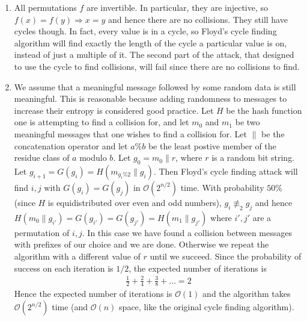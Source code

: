 \begin{enumerate}
\item All permutations $f$ are invertible. In particular,  they are injective, so
$f(x)=f(y) \Rightarrow x=y$ and hence there are no collisions. They still have
cycles though. In fact, every value is in a cycle, so Floyd's cycle finding algorithm
will find exactly the length of the cycle a particular value is on, instead of
just a multiple of it. The second part of the attack, that designed to use the
cycle to find collisions, will fail since there are no collisions to find.

\item We assume that a meaningful message followed by some random data is
still meaningful. This is reasonable because adding randomness to messages to
increase their entropy is considered good practice. Let $H$ be the hash function
one is attempting to find a collision for, and let $m_0$ and $m_1$ be two
meaningful messages that one wishes to find a collision for. Let $\|$ be the
concatenation operator and let $a\%b$ be the least postive member of the residue
class of $a$ modulo $b$. Let $g_0=m_0\|r$, where $r$ is a random bit string.
Let $g_{i+1}=G(g_i)=H(m_{g_i\%2}\|g_i)$. Then Floyd's cycle finding attack will
find $i,j$ with $G(g_i)=G(g_j)$ in $\mathcal{O}(2^{n/2})$ time. With probability
$50\%$ (since $H$ is equidistributed over even and odd numbers), $g_i\not\equiv_2 g_j$
and hence $H(m_0\|g_{i'})=G(g_{i'})=G(g_{j'})=H(m_1\|g_{j'})$ where $i',j'$ are
a permutation of $i,j$. In this case we have found a collision between messages
with prefixes of our choice and we are done. Otherwise we repeat the algorithm
with a different value of $r$ until we succeed. Since the probability of success
on each iteration is $1/2$, the expected number of iterations is
\begin{eqnarray*}
	\frac{1}{2}+\frac{2}{4}+\frac{3}{8}+\dots = 2
\end{eqnarray*}
Hence the expected number of iterations is $\mathcal{O}(1)$ and the algorithm
takes $\mathcal{O}(2^{n/2})$ time (and $\mathcal{O}(n)$ space, like the original
cycle finding algorithm).

\end{enumerate}
